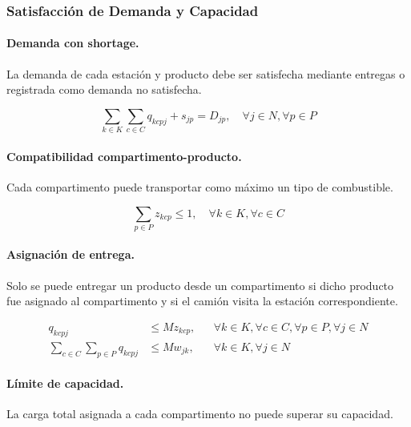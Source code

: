 \subsubsection{Satisfacción de Demanda y Capacidad}

\paragraph{Demanda con shortage.}

La demanda de cada estación y producto debe ser satisfecha mediante entregas o registrada como demanda no satisfecha.

\begin{equation}
    \sum_{k \in K} \sum_{c \in C} q_{kcpj} + s_{jp} = D_{jp},
    \quad \forall j \in N, \forall p \in P
\end{equation}

\paragraph{Compatibilidad compartimento-producto.}

Cada compartimento puede transportar como máximo un tipo de combustible.

\begin{equation}
    \sum_{p \in P} z_{kcp} \leq 1,
    \quad \forall k \in K, \forall c \in C
\end{equation}

\paragraph{Asignación de entrega.}

Solo se puede entregar un producto desde un compartimento si dicho producto fue asignado al compartimento y si el camión visita la estación correspondiente.

\begin{align}
    q_{kcpj} &\leq M z_{kcp},
    && \forall k \in K, \forall c \in C, \forall p \in P, \forall j \in N \\
    \sum_{c \in C} \sum_{p \in P} q_{kcpj}
    &\leq M w_{jk},
    && \forall k \in K, \forall j \in N
\end{align}

\paragraph{Límite de capacidad.}

La carga total asignada a cada compartimento no puede superar su capacidad.

